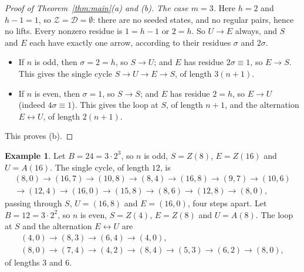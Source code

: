 \documentclass[11pt]{amsart}
\theoremstyle{definition}
\newtheorem*{example}{Example}
\theoremstyle{remark}
\newcommand{\Zs}{\mathcal{Z}}
\newcommand{\Ds}{\mathcal{D}}
\begin{document}
\begin{proof}[Proof of Theorem~\ref{thm:main}\textup{(a)} and \textup{(b)}]
\emph{The case $m=3$.} Here $h=2$ and $h-1=1$, so $\Zs=\Ds=\emptyset$: there are no seeded states, and no regular pairs, hence no lifts. Every nonzero residue is $1=h-1$ or $2=h$. So $U\to E$ always, and $S$ and $E$ each have exactly one arrow, according to their residues $\sigma$ and $2\sigma$.
\begin{itemize}
\item If $n$ is odd, then $\sigma=2=h$, so $S\to U$; and $E$ has residue $2\sigma\equiv1$, so $E\to S$. This gives the single cycle $S\to U\to E\to S$, of length $3(n+1)$.
\item If $n$ is even, then $\sigma=1$, so $S\to S$; and $E$ has residue $2=h$, so $E\to U$ (indeed $4\sigma\equiv1$). This gives the loop at $S$, of length $n+1$, and the alternation $E\leftrightarrow U$, of length $2(n+1)$.
\end{itemize}
This proves (b).
\end{proof}

\begin{example}
Let $B=24=3\cdot2^3$, so $n$ is odd, $S=Z(8)$, $E=Z(16)$ and $U=A(16)$. The single cycle, of length $12$, is
\begin{multline*}
(8,0)\to(16,7)\to(10,8)\to(8,4)\to(16,8)\to(9,7)\to(10,6)\\
\to(12,4)\to(16,0)\to(15,8)\to(8,6)\to(12,8)\to(8,0),
\end{multline*}
passing through $S$, $U=(16,8)$ and $E=(16,0)$, four steps apart. Let $B=12=3\cdot2^2$, so $n$ is even, $S=Z(4)$, $E=Z(8)$ and $U=A(8)$. The loop at $S$ and the alternation $E\leftrightarrow U$ are
\begin{gather*}
(4,0)\to(8,3)\to(6,4)\to(4,0),\\
(8,0)\to(7,4)\to(4,2)\to(8,4)\to(5,3)\to(6,2)\to(8,0),
\end{gather*}
of lengths $3$ and $6$.
\end{example}
\end{document}
